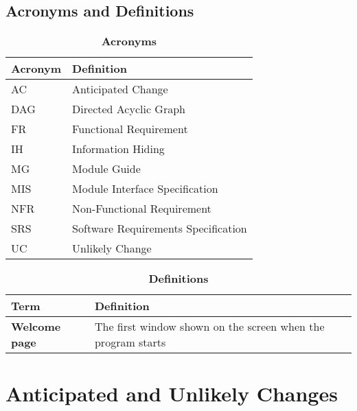 \documentclass[12pt,letterpaper]{article}
\begin{document}
	\subsection{Acronyms and Definitions}
        \begin{table}[H]
            \centering
            \caption{\bf Acronyms}
            \label{TableAcronym}
            \bigskip
            \def\arraystretch{1.5}
            \begin{tabularx}{\textwidth}{p{3.7cm}X}
                \toprule
                \textbf{Acronym} & \textbf{Definition} \\
                \midrule
                AC & Anticipated Change\\
                DAG & Directed Acyclic Graph\\
                FR & Functional Requirement\\
                IH & Information Hiding\\
                MG & Module Guide\\
                MIS & Module Interface Specification\\
                NFR & Non-Functional Requirement\\
                SRS & Software Requirements Specification\\
                UC & Unlikely Change\\
            \bottomrule
            \end{tabularx}
        \end{table}

\begin{table}[H]
            \centering
            \caption{\bf Definitions}
            \label{TableDefinitions}
            \bigskip
            \def\arraystretch{1.5}
            \begin{tabularx}{\textwidth}{p{3.7cm}X}
                \toprule
                \textbf{Term} & \textbf{Definition}\\
                \midrule
                \textbf{Welcome page} & The first window shown on the screen when the program starts\\

                \bottomrule
            \end{tabularx}
        \end{table}

	
	\section{Anticipated and Unlikely Changes} \label{SecChange}
\end{document}
